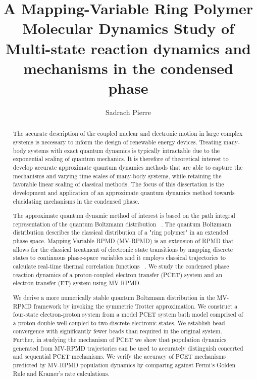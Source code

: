\documentclass[phd,tocprelim]{cornell}
\title {A Mapping-Variable Ring Polymer Molecular Dynamics Study of Multi-state reaction dynamics and mechanisms in the condensed phase}
\author {Sadrach Pierre}
\begin{document}
\maketitle
\makecopyright

\begin{abstract}

 The accurate description of the coupled nuclear and electronic motion in large complex systems is necessary to inform the design of renewable energy devices. Treating many-body systems with exact quantum dynamics is typically intractable due to the exponential scaling of quantum mechanics.  It is therefore of theoretical interest to develop accurate approximate quantum dynamics methods that are able to capture the mechanisms and varying time scales of many-body systems, while retaining the favorable linear scaling of classical methods.  The focus of this dissertation is the development and application of an approximate quantum dynamics method towards elucidating mechanisms in the condensed phase. 


The approximate quantum dynamic method of interest is based on the path integral representation of the quantum Boltzmann distribution ~\cite{DCPW1981}. The quantum Boltzmann distribution describes the classical distribution of a "ring polymer" in an extended phase space. Mapping Variable RPMD (MV-RPMD) is an extension of RPMD that allows for the classical treatment of electronic state transitions by mapping discrete states to continuous phase-space variables and it employs classical trajectories to calculate real-time thermal correlation functions ~\cite{NA2013}. We study the condensed phase reaction dynamics of a proton-coupled electron transfer (PCET) system and an electron transfer (ET) system using MV-RPMD.


We derive a more numerically stable quantum Boltzmann distribution in the MV-RPMD framework by invoking the symmetric Trotter approximation. We construct a four-state electron-proton system from a model PCET system bath model comprised of a proton double well coupled to two discrete electronic states. We establish bead convergence with significantly fewer beads than required in the original system. Further, in studying the mechanism of PCET we show that population dynamics generated from MV-RPMD trajectories can be used to accurately distinguish concerted and sequential PCET mechanisms. We verify the accuracy of PCET mechanisms predicted by MV-RPMD population dynamics by comparing against Fermi's Golden Rule and Kramer's rate calculations. 


\end{abstract}
\end{document}
